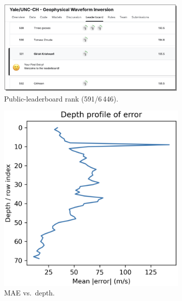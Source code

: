 \documentclass{article}
\begin{document}
\begin{figure}[t]
    \centering
    \begin{subfigure}[b]{0.32\linewidth}
        \centering
        \includegraphics[width=\linewidth]{figures/kaggle_rank.png}
        \caption{Public-leaderboard rank (591/6\,446).}
        \label{fig:kaggle_submission}
    \end{subfigure}
    \hfill
    \begin{subfigure}[b]{0.32\linewidth}
        \centering
        \includegraphics[width=\linewidth]{figures/fdonet_error_depth.png}
        \caption{MAE vs.\ depth.}
        \label{fig:fdonet_depth}
    \end{subfigure}
    \hfill
    \begin{subfigure}[b]{0.32\linewidth}

\end{subfigure}
\end{figure}
\end{document}
